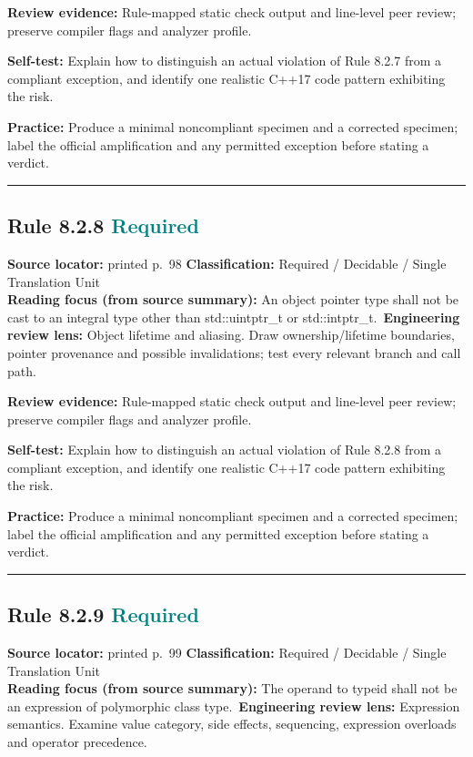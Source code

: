 \documentclass[10pt,letterpaper]{article}
\begin{document}
\textbf{Review evidence:} Rule-mapped static check output and line-level peer review; preserve compiler flags and analyzer profile.

\textbf{Self-test:} Explain how to distinguish an actual violation of Rule 8.2.7 from a compliant exception, and identify one realistic C++17 code pattern exhibiting the risk.\par
\textbf{Practice:} Produce a minimal noncompliant specimen and a corrected specimen; label the official amplification and any permitted exception before stating a verdict.
\smallskip\hrule\smallskip
\subsection*{Rule 8.2.8 \enspace \texorpdfstring{\small\textcolor{teal}{Required}}{Required}}
\noindent\textbf{Source locator:} printed p.~98 \quad\textbf{Classification:} Required / Decidable / Single Translation Unit\\
\textbf{Reading focus (from source summary):} An object pointer type shall not be cast to an integral type other than std::uintptr\_t or std::intptr\_t.\
\textbf{Engineering review lens:} Object lifetime and aliasing. Draw ownership/lifetime boundaries, pointer provenance and possible invalidations; test every relevant branch and call path.

\textbf{Review evidence:} Rule-mapped static check output and line-level peer review; preserve compiler flags and analyzer profile.

\textbf{Self-test:} Explain how to distinguish an actual violation of Rule 8.2.8 from a compliant exception, and identify one realistic C++17 code pattern exhibiting the risk.\par
\textbf{Practice:} Produce a minimal noncompliant specimen and a corrected specimen; label the official amplification and any permitted exception before stating a verdict.
\smallskip\hrule\smallskip
\subsection*{Rule 8.2.9 \enspace \texorpdfstring{\small\textcolor{teal}{Required}}{Required}}
\noindent\textbf{Source locator:} printed p.~99 \quad\textbf{Classification:} Required / Decidable / Single Translation Unit\\
\textbf{Reading focus (from source summary):} The operand to typeid shall not be an expression of polymorphic class type.\
\textbf{Engineering review lens:} Expression semantics. Examine value category, side effects, sequencing, expression overloads and operator precedence.
\end{document}
